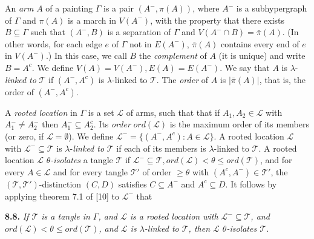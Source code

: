 An \textit{arm} $A$ of a painting $\Gamma$ is a pair $(A^-, \pi(A))$, where $A^-$ is a subhypergraph of $\Gamma$ and $\pi(A)$ is a march in $V(A^-)$, with the property that there exists $B \subseteq \Gamma$ such that $(A^-, B)$ is a separation of $\Gamma$ and $V(A^- \cap B) = \bar{\pi}(A)$. (In other words, for each edge $e$ of $\Gamma$ not in $E(A^-)$, $\bar{\pi}(A)$ contains every end of $e$ in $V(A^-)$.) In this case, we call $B$ the \textit{complement} of $A$ (it is unique) and write $B = A^c$. We define $V(A) = V(A^-), E(A) = E(A^-)$. We say that $A$ is $\lambda$-\textit{linked to} $\mathscr{T}$ if $(A^-, A^c)$ is $\lambda$-linked to $\mathscr{T}$. The \textit{order} of $A$ is $|\bar{\pi}(A)|$, that is, the order of $(A^-, A^c)$.

A \textit{rooted location} in $\Gamma$ is a set $\mathscr{L}$ of arms, such that that if $A_1, A_2 \in \mathscr{L}$ with $A^-_1 \ne A^-_2$ then $A^-_1 \subseteq A^c_2$. Its \textit{order} $ord(\mathscr{L})$ is the maximum order of its members (or zero, if $\mathscr{L} = \emptyset$). We define $\mathscr{L}^- = \{(A^-, A^c) : A \in \mathscr{L}\}$. A rooted location $\mathscr{L}$ with $\mathscr{L}^- \subseteq \mathscr{T}$ is $\lambda$-\textit{linked to} $\mathscr{T}$ if each of its members is $\lambda$-linked to $\mathscr{T}$. A rooted location $\mathscr{L}$ \textit{$\theta$-isolates} a tangle $\mathscr{T}$ if $\mathscr{L}^- \subseteq \mathscr{T}, ord(\mathscr{L}) < \theta \le ord(\mathscr{T})$, and for every $A \in \mathscr{L}$ and for every tangle $\mathscr{T}'$ of order $\ge \theta$ with $(A^c, A^-) \in \mathscr{T}'$, the $(\mathscr{T}, \mathscr{T}')$-distinction $(C, D)$ satisfies $C \subseteq A^-$ and $A^c \subseteq D$. It follows by applying theorem 7.1 of [10] to $\mathscr{L}^-$ that

\textbf{8.8.} \textit{If $\mathscr{T}$ is a tangle in $\Gamma$, and $\mathscr{L}$ is a rooted location with $\mathscr{L}^- \subseteq \mathscr{T}$, and $ord(\mathscr{L}) < \theta \le ord(\mathscr{T})$, and $\mathscr{L}$ is $\lambda$-linked to $\mathscr{T}$, then $\mathscr{L}$ $\theta$-isolates $\mathscr{T}$.}
